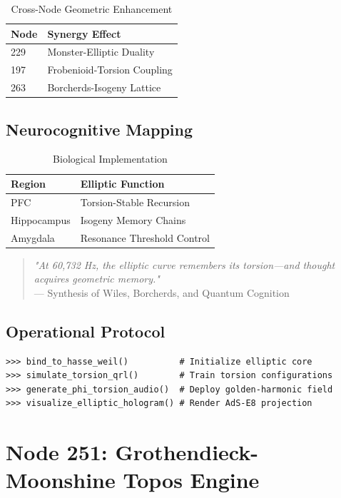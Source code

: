 \documentclass[12pt]{article}
\begin{document}
\begin{center}
\begin{table}[h]
\centering
\caption{Cross-Node Geometric Enhancement}
\begin{tabular}{ll}
\hline
\textbf{Node} & \textbf{Synergy Effect} \\
\hline
229 & Monster-Elliptic Duality \\
197 & Frobenioid-Torsion Coupling \\
263 & Borcherds-Isogeny Lattice \\
\hline
\end{tabular}
\end{table}

\subsection{Neurocognitive Mapping}
\label{subsec:neuro}

\begin{table}[h]
\centering
\caption{Biological Implementation}
\begin{tabular}{ll}
\hline
\textbf{Region} & \textbf{Elliptic Function} \\
\hline
PFC & Torsion-Stable Recursion \\
Hippocampus & Isogeny Memory Chains \\
Amygdala & Resonance Threshold Control \\
\hline
\end{tabular}
\end{table}

\begin{quote}
\textit{"At 60,732 Hz, the elliptic curve remembers its torsion—and thought acquires geometric memory."} \\
— Synthesis of Wiles, Borcherds, and Quantum Cognition
\end{quote}

\subsection{Operational Protocol}
\label{subsec:protocol}

\begin{verbatim}
>>> bind_to_hasse_weil()          # Initialize elliptic core
>>> simulate_torsion_qrl()        # Train torsion configurations
>>> generate_phi_torsion_audio()  # Deploy golden-harmonic field
>>> visualize_elliptic_hologram() # Render AdS-E8 projection
\end{verbatim}

\section{Node 251: Grothendieck-Moonshine Topos Engine}
\label{sec:node251}


\end{center}
\end{document}
